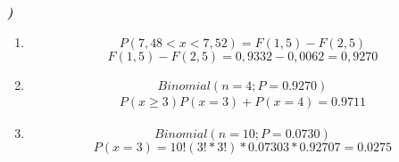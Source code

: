 \documentclass[12pt]{article}
\newcounter{instn}
\newcommand{\instnum}{\arabic{instn}}
\newcommand{\myline}[1]{
    \emph{\textbf{#1)}}
    \addtocounter{instn}{1}
}
\newenvironment{question}
 {
    \myline{\instnum} 
    }
    {
 }
\begin{document}
    \begin{question}

        \begin{enumerate}[label={\textbf{\alph*)}}]
            \item 
            \[
                P (7,48 < x < 7,52) = F(1,5) - F(2,5) 
            \]
            \[
                F(1,5) - F(2,5) = 0,9332 - 0,0062 = 0,9270
            \]

            \item 
            \[
                Binomial(n = 4; P= 0.9270)
            \]
            \begin{align*}
                P(x \geq 3) P(x=3) + P(x=4) = 0.9711 
            \end{align*}
            \item 
            \[
                Binomial(n = 10; P= 0.0730)
            \]
            \begin{equation}
                P(x = 3) = 10!(3!*3!)*0.07303*0.92707 = 0.0275 
            \end{equation}
        \end{enumerate}
        
    \end{question}

\end{document}
